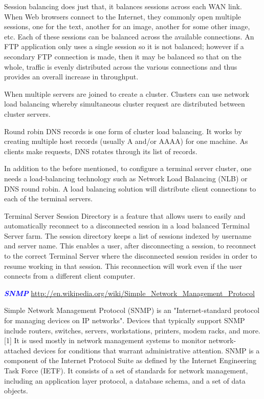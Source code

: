 \documentclass[9pt]{amsart}
\newcommand{\filldots}{\noindent \textbf {\textcolor {blue} {\dotfill}} }
\begin{document}
\begin{multicols}{2}
\noindent Session balancing does just that, it balances sessions across each WAN link. When Web browsers connect to the Internet, they commonly open multiple sessions, one for the text, another for an image, another for some other image, etc. Each of these sessions can be balanced across the available connections. An FTP application only uses a single session so it is not balanced; however if a secondary FTP connection is made, then it may be balanced so that on the whole, traffic is evenly distributed across the various connections and thus provides an overall increase in throughput.

\noindent When multiple servers are joined to create a cluster. Clusters can use network load balancing whereby simultaneous cluster request are distributed between cluster servers.

\noindent Round robin DNS records is one form of cluster load balancing. It works by creating multiple host records (usually A and/or AAAA) for one machine. As clients make requests, DNS rotates through its list of records.

\noindent In addition to the before mentioned, to configure a terminal server cluster, one needs a load-balancing technology such as Network Load Balancing (NLB) or DNS round robin. A load balancing solution will distribute client connections to each of the terminal servers.

\noindent Terminal Server Session Directory is a feature that allows users to easily and automatically reconnect to a disconnected session in a load balanced Terminal Server farm. The session directory keeps a list of sessions indexed by username and server name. This enables a user, after disconnecting a session, to reconnect to the correct Terminal Server where the disconnected session resides in order to resume working in that session. This reconnection will work even if the user connects from a different client computer.

\filldots
 
\noindent \textbf {\textcolor {blue} {\em SNMP}} 
\url {http://en.wikipedia.org/wiki/Simple_Network_Management_Protocol}

Simple Network Management Protocol (SNMP) is an "Internet-standard protocol for managing devices on IP networks". Devices that typically support SNMP include routers, switches, servers, workstations, printers, modem racks, and more.[1] It is used mostly in network management systems to monitor network-attached devices for conditions that warrant administrative attention. SNMP is a component of the Internet Protocol Suite as defined by the Internet Engineering Task Force (IETF). It consists of a set of standards for network management, including an application layer protocol, a database schema, and a set of data objects.


\end{multicols}
\end{document}
